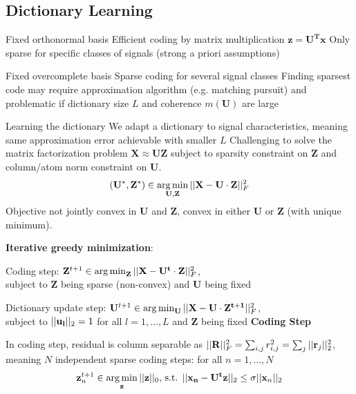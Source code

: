 \documentclass[12pt]{article}
\begin{document}
\subsection{Dictionary Learning}
\ulb
\item Fixed orthonormal basis
\ulb
\pro Efficient coding by matrix multiplication $\mathbf{z = U^T x}$
\con Only sparse for specific classes of signals (strong a priori assumptions)
\ule
\item Fixed overcomplete basis
\ulb
\pro Sparse coding for several signal classes
\con Finding sparsest code may require approximation algorithm (e.g. matching pursuit) and problematic if dictionary size $L$ and coherence $m(\mathbf{U})$ are large
\ule
\item Learning the dictionary
\ulb
\pro We adapt a dictionary to signal characteristics, meaning same approximation error achievable with smaller $L$
\con Challenging to solve the matrix factorization problem $\mathbf{X \approx UZ}$ subject to sparsity constraint on $\mathbf{Z}$ and column/atom norm constraint on $\mathbf{U}$.
\ule
\ule
\[ (\mathbf{U^*, Z^*}) \in \operatorname*{arg\,min}_{\mathbf{U,Z}} ||\mathbf{X - U\cdot Z}||_F^2 \]
Objective not jointly convex in $\mathbf{U}$ and $\mathbf{Z}$, convex in either $\mathbf{U}$ or $\mathbf{Z}$ (with unique minimum).
\par \textbf{Iterative greedy minimization}:
\ulb
\item Coding step: $\mathbf{Z}^{t+1} \in \operatorname*{arg\,min}_{\mathbf{Z}} ||\mathbf{X - U^t\cdot Z}||_F^2$, \\
subject to $\mathbf{Z}$ being sparse (non-convex) and $\mathbf{U}$ being fixed
\item Dictionary update step: $\mathbf{U}^{t+1} \in \operatorname*{arg\,min}_{\mathbf{U}} ||\mathbf{X - U\cdot Z^{t+1}}||_F^2$, \\
subject to $||\mathbf{u_l}||_2 = 1$ for all $l = 1,\dots ,L$ and $\mathbf{Z}$ being fixed
\ule
\textbf{Coding Step}
\par In coding step, residual is column separable as $||\mathbf{R}||_F^2 = \sum_{i,j} r^2_{i,j} = \sum_j ||\mathbf{r}_j||^2_2$, meaning $N$ independent sparse coding steps: for all $n=1,\dots ,N$
\[ \mathbf{z}_n^{t+1} \in \operatorname*{arg\,min}_{\mathbf{z}} ||\mathbf{z}||_0 \text{, s.t. } ||\mathbf{x_n - U^tz}||_2 \leq \sigma ||\mathbf{x}_n||_2 \]
\end{document}
